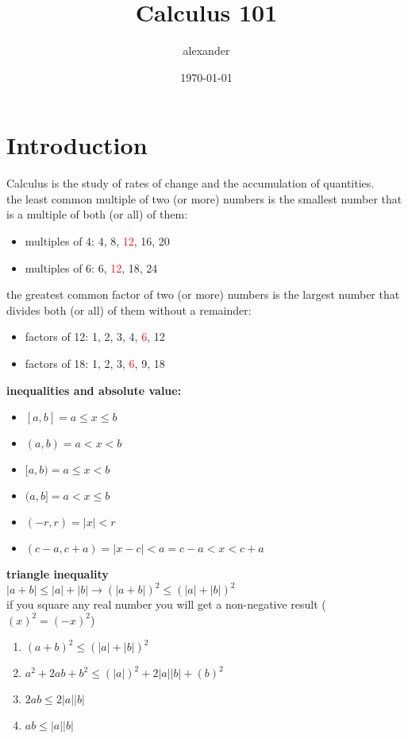 \documentclass{article}
\title{Calculus 101}
\author{alexander}
\date{\today}
\begin{document}
\maketitle

\section*{Introduction}

Calculus is the study of rates of change and the accumulation of quantities.\\

the least common multiple of two (or more) numbers is the smallest number that is a multiple of both (or all) of them:
	\begin{itemize}
		\item multiples of 4: 4, 8, \textcolor{red}{12}, 16, 20
		\item multiples of 6: 6, \textcolor{red}{12}, 18, 24
	\end{itemize}

the greatest common factor of two (or more) numbers is the largest number that divides both (or all) of them without a remainder:
	\begin{itemize}
		\item factors of 12: 1, 2, 3, 4, \textcolor{red}{6}, 12
		\item factors of 18: 1, 2, 3, \textcolor{red}{6}, 9, 18
	\end{itemize}

\textbf{inequalities and absolute value:}
	\begin{itemize}	
		\item $[a, b] = a \leq x \leq b$
		\item $(a, b) = a < x < b$
		\item $[a, b) = a \leq x < b$
		\item $(a, b] = a < x \leq b$
		\item $(-r, r) = \lvert x\rvert < r$
		\item $(c - a, c + a) = \lvert x - c\rvert < a = c - a < x < c + a$
	\end{itemize}

\textbf{triangle inequality}\\

$\lvert a + b\rvert \leq \lvert a \rvert + \lvert b\rvert \to (\lvert a + b\rvert)^2 \leq (\lvert a \rvert + \lvert b\rvert)^2$\\

if you square any real number you will get a non-negative result ($(x)^2 = (-x)^2$)
	\begin{enumerate}
		\item $(a + b)^2 \leq (\lvert a\rvert + \lvert b\rvert)^2$
		\item $a^2 + 2ab + b^2 \leq (\lvert a\rvert)^2 + 2\lvert a\rvert\lvert b\rvert + (b)^2$
		\item $2ab \leq 2\lvert a\rvert\lvert b \rvert$
		\item $ab \leq \lvert a\rvert\lvert b\rvert$
	\end{enumerate}
\end{document}
